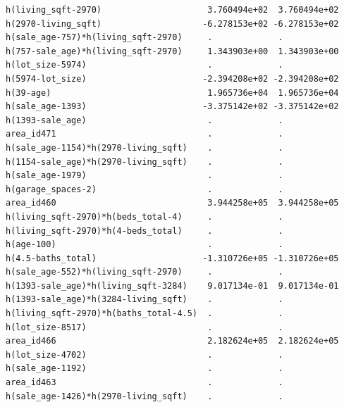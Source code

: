 \documentclass[
]{article}
\begin{document}
\begin{verbatim}
h(living_sqft-2970)                     3.760494e+02  3.760494e+02
h(2970-living_sqft)                    -6.278153e+02 -6.278153e+02
h(sale_age-757)*h(living_sqft-2970)     .             .           
h(757-sale_age)*h(living_sqft-2970)     1.343903e+00  1.343903e+00
h(lot_size-5974)                        .             .           
h(5974-lot_size)                       -2.394208e+02 -2.394208e+02
h(39-age)                               1.965736e+04  1.965736e+04
h(sale_age-1393)                       -3.375142e+02 -3.375142e+02
h(1393-sale_age)                        .             .           
area_id471                              .             .           
h(sale_age-1154)*h(2970-living_sqft)    .             .           
h(1154-sale_age)*h(2970-living_sqft)    .             .           
h(sale_age-1979)                        .             .           
h(garage_spaces-2)                      .             .           
area_id460                              3.944258e+05  3.944258e+05
h(living_sqft-2970)*h(beds_total-4)     .             .           
h(living_sqft-2970)*h(4-beds_total)     .             .           
h(age-100)                              .             .           
h(4.5-baths_total)                     -1.310726e+05 -1.310726e+05
h(sale_age-552)*h(living_sqft-2970)     .             .           
h(1393-sale_age)*h(living_sqft-3284)    9.017134e-01  9.017134e-01
h(1393-sale_age)*h(3284-living_sqft)    .             .           
h(living_sqft-2970)*h(baths_total-4.5)  .             .           
h(lot_size-8517)                        .             .           
area_id466                              2.182624e+05  2.182624e+05
h(lot_size-4702)                        .             .           
h(sale_age-1192)                        .             .           
area_id463                              .             .           
h(sale_age-1426)*h(2970-living_sqft)    .             .           
                                                                  

\end{verbatim}
\end{document}
